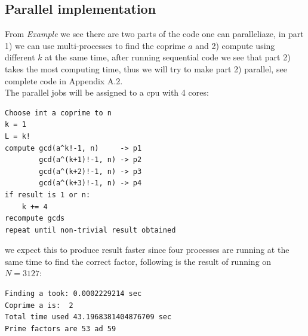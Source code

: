 \documentclass[10pt]{article}
\begin{document}
\subsection{Parallel implementation}
From \textit{Example} we see there are two parts of the code one can paralleliaze, in part 1) we can use multi-processes to find the coprime $a$ and 2) compute using different $k$ at the same time, after running sequential code we see that part 2) takes the most computing time, thus we will try to make part 2) parallel, see complete code in Appendix A.2.\\
The parallel jobs will be assigned to a cpu with 4 cores:
\begin{verbatim}
Choose int a coprime to n
k = 1
L = k!
compute gcd(a^k!-1, n)     -> p1
        gcd(a^(k+1)!-1, n) -> p2
        gcd(a^(k+2)!-1, n) -> p3
        gcd(a^(k+3)!-1, n) -> p4
if result is 1 or n:
    k += 4
recompute gcds
repeat until non-trivial result obtained
\end{verbatim} 
we expect this to produce result faster since four processes are running at the same time to find the correct factor, following is the result of running on $N=3127$:
\begin{verbatim}
Finding a took: 0.0002229214 sec
Coprime a is:  2
Total time used 43.1968381404876709 sec
Prime factors are 53 ad 59
\end{verbatim}
\end{document}
